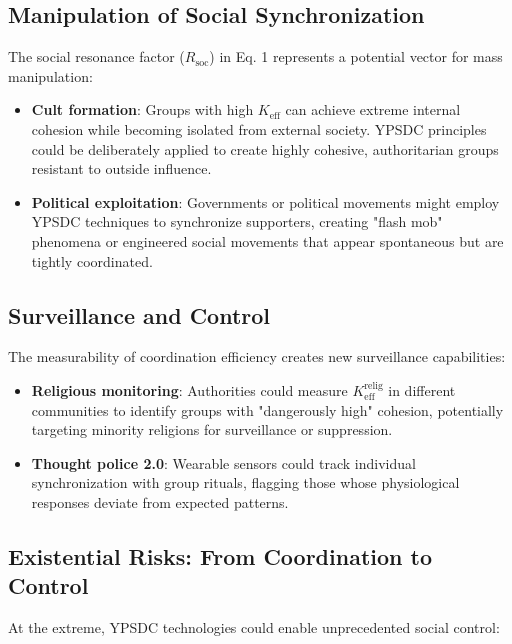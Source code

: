 \documentclass[12pt,a4paper]{article}
\begin{document}
	\subsection{Manipulation of Social Synchronization}
	
	The social resonance factor ($R_{\mathrm{soc}}$) in Eq. 1 represents a potential vector for mass manipulation:
	
	\begin{itemize}
		\item \textbf{Cult formation}: Groups with high $K_{\mathrm{eff}}$ can achieve extreme internal cohesion while becoming isolated from external society. YPSDC principles could be deliberately applied to create highly cohesive, authoritarian groups resistant to outside influence.
		
		\item \textbf{Political exploitation}: Governments or political movements might employ YPSDC techniques to synchronize supporters, creating "flash mob" phenomena or engineered social movements that appear spontaneous but are tightly coordinated.
	\end{itemize}
	
	\subsection{Surveillance and Control}
	
	The measurability of coordination efficiency creates new surveillance capabilities:
	
	\begin{itemize}
		\item \textbf{Religious monitoring}: Authorities could measure $K_{\mathrm{eff}}^{\mathrm{relig}}$ in different communities to identify groups with "dangerously high" cohesion, potentially targeting minority religions for surveillance or suppression.
		
		\item \textbf{Thought police 2.0}: Wearable sensors could track individual synchronization with group rituals, flagging those whose physiological responses deviate from expected patterns.
	\end{itemize}
	
	\subsection{Existential Risks: From Coordination to Control}
	
	At the extreme, YPSDC technologies could enable unprecedented social control:
	
\end{document}
